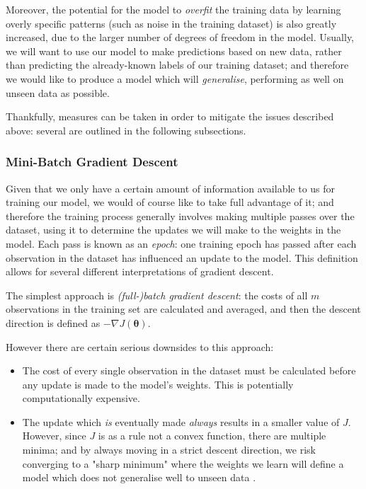 \documentclass{article}[11pt]
\begin{document}
        Moreover, the potential for the model to \textit{overfit} the training data by learning overly specific patterns (such as noise in the training dataset) is also greatly increased, due to the larger number of degrees of freedom in the model. Usually, we will want to use our model to make predictions based on new data, rather than predicting the already-known labels of our training dataset; and therefore we would like to produce a model which will \textit{generalise}, performing as well on unseen data as possible.
        
        Thankfully, measures can be taken in order to mitigate the issues described above: several are outlined in the following subsections.
        
        
        \subsubsection{Mini-Batch Gradient Descent}
            
            Given that we only have a certain amount of information available to us for training our model, we would of course like to take full advantage of it; and therefore the training process generally involves making multiple passes over the dataset, using it to determine the updates we will make to the weights in the model. Each pass is known as an \textit{epoch}: one training epoch has passed after each observation in the dataset has influenced an update to the model. This definition allows for several different interpretations of gradient descent.
            
            The simplest approach is \textit{(full-)batch gradient descent}: the costs of all $m$ observations in the training set are calculated and averaged, and then the descent direction is defined as $- \nabla J(\boldsymbol{\theta})$.
            
            However there are certain serious downsides to this approach:
            
            \begin{itemize}
                
                \item The cost of every single observation in the dataset must be calculated before any update is made to the model's weights. This is potentially computationally expensive.
                
                \item The update which \textit{is} eventually made \textit{always} results in a smaller value of $J$. However, since $J$ is as a rule not a convex function, there are multiple minima; and by always moving in a strict descent direction, we risk converging to a "sharp minimum" where the weights we learn will define a model which does not generalise well to unseen data \cite{large_batch}.
                
            \end{itemize}
            
\end{document}
